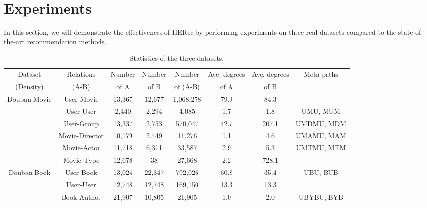 \section{Experiments \label{sec-exp}}
In this section, we will demonstrate the effectiveness of HERec by performing experiments on three real datasets compared to the state-of-the-art recommendation methods.

\begin{table}[t]%
\centering
\caption{\label{tab_Data} Statistics of the three datasets.}
{
\begin{tabular}{|c||c|c|c|c|c|c|c|}
\hline
{Dataset} & {Relations} & {Number} & {Number} & {Number} & {Ave. degrees} & {Ave. degrees} & \multirow{2}{*}{Meta-paths}\\
{(Density)} & {(A-B)} & {of A} & {of B} & {of (A-B)}  & {of A} & {of B} &  \multirow{2}{*}{}\\
\hline
\hline
\multirow{6}{*}{Douban Movie} & {User-Movie} & {13,367} & {12,677} & {1,068,278} & {79.9} & {84.3} & {} \\
\cline{2-7}
\multirow{6}{*}{(0.63\%)} &  {User-User} & {2,440} & {2,294} & {4,085} & {1.7} & {1.8} & {UMU, MUM} \\
\cline{2-7}
\multirow{6}{*}{} &{User-Group} & {13,337} & {2,753} & {570,047} & {42.7} & {207.1} & {UMDMU, MDM}\\
\cline{2-7}
\multirow{6}{*}{} & {Movie-Director} & {10,179} & {2,449} & {11,276} & {1.1} & {4.6} & {UMAMU, MAM} \\
\cline{2-7}
\multirow{6}{*}{} & {Movie-Actor} & {11,718} & {6,311} & {33,587} & {2.9} & {5.3} & {UMTMU, MTM}\\
\cline{2-7}
\multirow{6}{*}{} & {Movie-Type} & {12,678} & {38} & {27,668} & {2.2} & {728.1} & {}\\
\hline
\hline
\multirow{5}{*}{Douban Book} & {User-Book} & {13,024} & {22,347} & {792,026} & {60.8} & {35.4} & \multirow{2}{*}{UBU, BUB} \\
\cline{2-7}
\multirow{5}{*}{(0.27\%)} & {User-User} & {12,748} & {12,748} & {169,150} & {13.3} & {13.3} & \multirow{2}{*}{UBPBU, BPB} \\
\cline{2-7}
\multirow{5}{*}{} & {Book-Author} & {21,907} & {10,805} & {21,905} & {1.0} & {2.0} & \multirow{2}{*}{UBYBU, BYB} \\

\end{tabular}}
\end{table}
